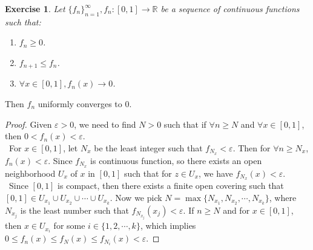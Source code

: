 \documentclass[12pt,leqno]{amsart}
\newtheorem{exercise}{Exercise}[section]
\theoremstyle{definition}
\numberwithin{equation}{subsection}
\begin{document}
\begin{exercise}
Let $\{f_n\}^\infty_{n=1}, f_n:[0,1]\to\mathbb{R}$ be a sequence of continuous functions such that:
\begin{enumerate}
    \item $f_n \geq 0$.
    \item $f_{n+1}\leq f_n$.
    \item $\forall x\in [0,1], f_n(x)\to 0$.
\end{enumerate}
\end{exercise}
Then $f_n$ uniformly converges to $0$.
\begin{proof}
Given $\varepsilon > 0$, we need to find $N > 0$ such that if $\forall n \geq N$ and $\forall x\in [0,1]$, then $0 < f_n(x) < \varepsilon$.\\
\hspace*{1em}\, For $x\in [0,1]$, let $N_x$ be the least integer such that $f_{N_x} < \varepsilon$. Then for $\forall n \geq N_x$, $f_n(x) < \varepsilon$. Since $f_{N_x}$ is continuous function, so there exists an open neighborhood $U_x$ of $x$ in $[0,1]$ such that for $z\in U_x$, we have $f_{N_x}(x) < \varepsilon$. \\
\hspace*{1em}\, Since $[0,1]$ is compact, then there exists a finite open covering such that $[0,1]\in U_{x_1}\cup U_{x_2} \cup \cdots \cup U_{x_k}$. Now we pick $N = \max\{N_{x_1},N_{x_2},\cdots,N_{x_k}\}$, where $N_{x_j}$ is the least number such that $f_{N_{x_j}}(x_j) < \varepsilon$. If $n\geq N$ and for $x\in[0,1]$, then $x\in U_{x_i}$ for some $i\in\{1,2,\cdots, k\}$, which implies $0 \leq f_n(x) \leq f_N(x) \leq f_{N_i}(x) < \varepsilon$.
\end{proof}
\end{document}
